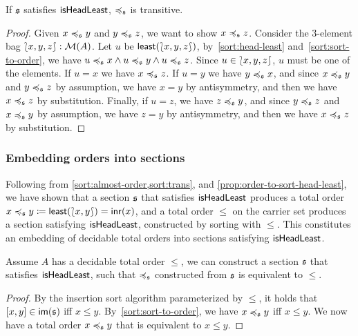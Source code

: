 \begin{proposition}
    \label{sort:trans}
    If $\mathfrak{s}$ satisfies $\operatorname{\mathsf{isHeadLeast}}$, $\preccurlyeq_{\mathfrak{s}}$ is transitive.
\end{proposition}
\begin{proof}
    Given $x \preccurlyeq_{\mathfrak{s}} y$ and $y \preccurlyeq_{\mathfrak{s}} z$, we want to show $x \preccurlyeq_{\mathfrak{s}} z$.
    Consider the 3-element bag ${\lbag}{x,y,z}{\rbag} : \mathcal{M}(A)$.
    Let $u$ be $\operatorname{\mathsf{least}}({\lbag}{x,y,z}{\rbag})$,
    by~\cref{sort:head-least} and~\cref{sort:sort-to-order},
    we have $u \preccurlyeq_{\mathfrak{s}} x \land u \preccurlyeq_{\mathfrak{s}} y \land u \preccurlyeq_{\mathfrak{s}} z$.
    Since $u \in {\lbag}{x,y,z}{\rbag}$, $u$ must be one of the elements.
    If $u = x$ we have $x \preccurlyeq_{\mathfrak{s}} z$.
    If $u = y$ we have $y \preccurlyeq_{\mathfrak{s}} x$,
    and since $x \preccurlyeq_{\mathfrak{s}} y$ and $y \preccurlyeq_{\mathfrak{s}} z$ by assumption,
    we have $x = y$ by antisymmetry, and then we have $x \preccurlyeq_{\mathfrak{s}} z$ by substitution.
    Finally, if $u = z$, we have $z \preccurlyeq_{\mathfrak{s}} y$, and since $y \preccurlyeq_{\mathfrak{s}} z$ and $x \preccurlyeq_{\mathfrak{s}} y$ by assumption,
    we have $z = y$ by antisymmetry, and then we have $x \preccurlyeq_{\mathfrak{s}} z$ by substitution.
\end{proof}

\subsubsection{Embedding orders into sections}
\label{sec:sort-embedding}

Following from \cref{sort:almost-order,sort:trans},
and \cref{prop:order-to-sort-head-least},
we have shown that a section $\mathfrak{s}$ that satisfies $\operatorname{\mathsf{isHeadLeast}}$ produces a total order
$x \leqs y \defeq \term{least}(\bag{x, y}) \id \inr(x)$,
and a total order $\leq$ on the carrier set produces a section satisfying $\operatorname{\mathsf{isHeadLeast}}$,
constructed by sorting with $\leq$.
%
This constitutes an embedding of decidable total orders into sections satisfying $\operatorname{\mathsf{isHeadLeast}}$.

\begin{proposition}
    \label{sort:o2s2o}
    Assume $A$ has a decidable total order $\leq$, we can construct a section $\mathfrak{s}$ that
    satisfies $\operatorname{\mathsf{isHeadLeast}}$, such that $\preccurlyeq_{\mathfrak{s}}$ constructed from $\mathfrak{s}$ is equivalent
    to $\leq$.
\end{proposition}
\begin{proof}
    By the insertion sort algorithm parameterized by $\leq$,
    it holds that $\inimage{[x, y]}$ iff $x \leq y$.
    By~\cref{sort:sort-to-order}, we have $x \preccurlyeq_{\mathfrak{s}} y$ iff $x \leq y$.
    We now have a total order $x \preccurlyeq_{\mathfrak{s}} y$ that is equivalent to $x \leq y$.
\end{proof}

